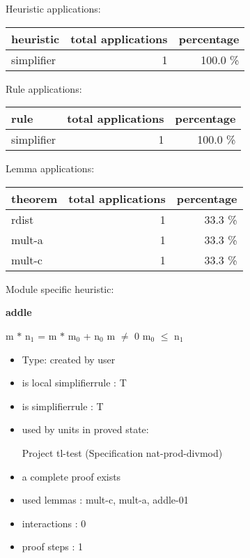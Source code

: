 \documentclass[a4paper]{article}
\begin{document}
\medskip


Heuristic applications:

\begin{supertabular}{l|r|r}
heuristic	& total applications & percentage \\ \hline
simplifier & 1 & 100.0 \% \\

\end{supertabular}

Rule applications:

\begin{supertabular}{l|r|r}
rule	        & total applications & percentage \\ \hline
simplifier & 1 & 100.0 \% \\

\end{supertabular}

Lemma applications:

\begin{supertabular}{l|r|r}
theorem	        & total applications & percentage \\ \hline
rdist & 1 & 33.3 \% \\
mult-a & 1 & 33.3 \% \\
mult-c & 1 & 33.3 \% \\

\end{supertabular}

Module specific heuristic:

\pagebreak

{\LARGE\bf addle}\label{lemma-addle}

\medskip

 \Fol m $*$ $\mbox{n}_{1}$ = m $*$ $\mbox{m}_{0}$ + $\mbox{n}_{0}$ \And m $\neq$ 0 \Imp $\mbox{m}_{0}$ $\le$ $\mbox{n}_{1}$

\begin{itemize}

\item Type: created by user

\item is local simplifierrule : T
\item is simplifierrule : T
\item used by units in proved state:

Project tl-test (Specification nat-prod-divmod)
\item       a complete proof exists
\item       used lemmas  : mult-c, mult-a, addle-01
\item       interactions : 0
\item       proof steps  : 1
\end{itemize}
\end{document}
